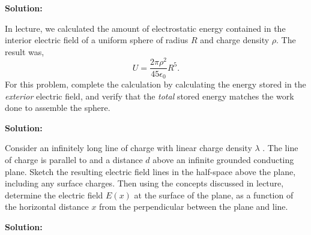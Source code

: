 \documentclass[11pt]{article}
\begin{document}
\textbf{Solution:}


\clearpage

\begin{problem}[\P 3.]
In lecture, we calculated the amount of electrostatic energy contained in the interior
electric field of a uniform sphere of radius $R$ and charge density $\rho$. The result was, 
\[
	U = \frac{2\pi\rho^2}{45\epsilon_0}R^5.
\]
For this problem,  complete the calculation by calculating the energy stored in the \textit{exterior}
electric field, and verify that the \textit{total} stored energy matches the work done to assemble the
sphere.
\end{problem}


\textbf{Solution:}


\clearpage

\begin{problem}[4.]
Consider an infinitely long line of charge with linear charge density $\lambda$ . The line of charge
is parallel to and a distance $d$ above an infinite grounded conducting plane. Sketch the
resulting electric field lines in the half-space above the plane, including any surface
charges. Then using the concepts discussed in lecture, determine the electric field $E(x)$ at
the surface of the plane, as a function of the horizontal distance $x$ from the perpendicular
between the plane and line.
\end{problem}


\textbf{Solution:}


\clearpage
\end{document}
